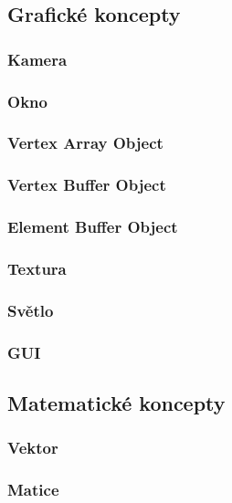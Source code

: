 \documentclass[12pt]{article}
\begin{document}
\subsection{Grafické koncepty}

\subsubsection{Kamera}

\subsubsection{Okno}

\subsubsection{Vertex Array Object}

\subsubsection{Vertex Buffer Object}

\subsubsection{Element Buffer Object}

\subsubsection{Textura}

\subsubsection{Světlo}

\subsubsection{GUI}

\subsection{Matematické koncepty}

\subsubsection{Vektor}

\subsubsection{Matice}
\end{document}
